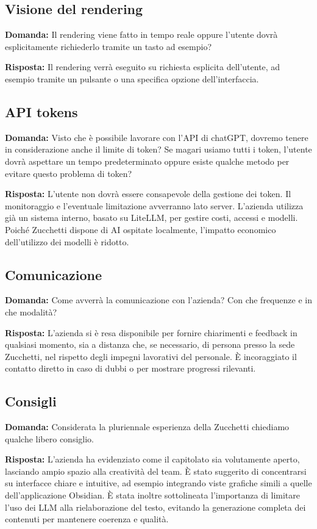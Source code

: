 \documentclass[a4paper,12pt]{article}
\begin{document}
{    \subsection{Visione del rendering}
    \textbf{Domanda:} Il rendering viene fatto in tempo reale oppure l’utente dovrà esplicitamente richiederlo tramite un tasto ad esempio?

    \textbf{Risposta:} Il rendering verrà eseguito su richiesta esplicita dell’utente, ad esempio tramite un pulsante o una specifica opzione dell’interfaccia.

    \subsection{API tokens}
    \textbf{Domanda:} Visto che è possibile lavorare con l’API di chatGPT, dovremo tenere in considerazione anche il limite di token? Se magari usiamo tutti i token, l’utente dovrà aspettare un tempo predeterminato oppure esiste qualche metodo per evitare questo problema di token?

    \textbf{Risposta:} L’utente non dovrà essere consapevole della gestione dei token. Il monitoraggio e l’eventuale limitazione avverranno lato server. L’azienda utilizza già un sistema interno, basato su LiteLLM, per gestire costi, accessi e modelli. Poiché Zucchetti dispone di AI ospitate localmente, l’impatto economico dell’utilizzo dei modelli è ridotto.

    \subsection{Comunicazione}
    \textbf{Domanda:} Come avverrà la comunicazione con l'azienda? Con che frequenze e in che modalità?

    \textbf{Risposta:} L’azienda si è resa disponibile per fornire chiarimenti e feedback in qualsiasi momento, sia a distanza che, se necessario, di persona presso la sede Zucchetti, nel rispetto degli impegni lavorativi del personale. È incoraggiato il contatto diretto in caso di dubbi o per mostrare progressi rilevanti.

    \subsection{Consigli}
    \textbf{Domanda:} Considerata la pluriennale esperienza della Zucchetti chiediamo qualche libero consiglio.

    \textbf{Risposta:} L’azienda ha evidenziato come il capitolato sia volutamente aperto, lasciando ampio spazio alla creatività del team. È stato suggerito di concentrarsi su interfacce chiare e intuitive, ad esempio integrando viste grafiche simili a quelle dell’applicazione Obsidian. È stata inoltre sottolineata l’importanza di limitare l’uso dei LLM alla rielaborazione del testo, evitando la generazione completa dei contenuti per mantenere coerenza e qualità.

}
\newpage
\end{document}
